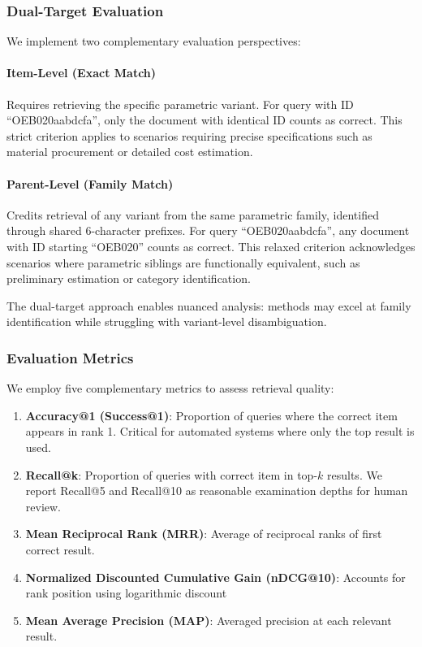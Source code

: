 \documentclass[preprint,12pt]{elsarticle}
\begin{document}
\subsubsection{Dual-Target Evaluation}

We implement two complementary evaluation perspectives:

\paragraph{Item-Level (Exact Match)}
Requires retrieving the specific parametric variant. For query with ID ``OEB020aabdcfa'', only the document with identical ID counts as correct. This strict criterion applies to scenarios requiring precise specifications such as material procurement or detailed cost estimation.

\paragraph{Parent-Level (Family Match)}
Credits retrieval of any variant from the same parametric family, identified through shared 6-character prefixes. For query ``OEB020aabdcfa'', any document with ID starting ``OEB020'' counts as correct. This relaxed criterion acknowledges scenarios where parametric siblings are functionally equivalent, such as preliminary estimation or category identification.

The dual-target approach enables nuanced analysis: methods may excel at family identification while struggling with variant-level disambiguation.

\subsubsection{Evaluation Metrics}

We employ five complementary metrics to assess retrieval quality:

\begin{enumerate}
    \item \textbf{Accuracy@1 (Success@1)}: Proportion of queries where the correct item appears in rank 1. Critical for automated systems where only the top result is used.
    
    \item \textbf{Recall@k}: Proportion of queries with correct item in top-$k$ results. We report Recall@5 and Recall@10 as reasonable examination depths for human review.
    
    \item \textbf{Mean Reciprocal Rank (MRR)}: Average of reciprocal ranks of first correct result.
    
    \item \textbf{Normalized Discounted Cumulative Gain (nDCG@10)}: Accounts for rank position using logarithmic discount
    
    \item \textbf{Mean Average Precision (MAP)}: Averaged precision at each relevant result.
\end{enumerate}
\end{document}
